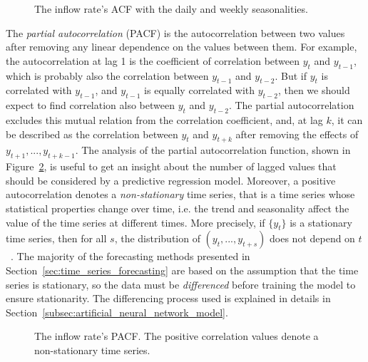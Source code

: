 \begin{figure}
  \begin{center}
  \end{center}
  \caption{The inflow rate's ACF with the daily and weekly seasonalities.}
  \label{fig:inflow_rate_acf}
\end{figure}

The \emph{partial autocorrelation} (PACF) is the autocorrelation between two values after removing any linear dependence on the values between them. For example, the autocorrelation at lag 1 is the coefficient of correlation between \( y_t \) and \( y_{t-1} \), which is probably also the correlation between \( y_{t-1} \) and \( y_{t-2} \). But if \( y_t \) is correlated with \( y_{t-1} \), and \( y_{t-1} \) is equally correlated with \( y_{t-2} \), then we should expect to find correlation also between \( y_t \) and \( y_{t-2} \). The partial autocorrelation excludes this mutual relation from the correlation coefficient, and, at lag \( k \), it can be described as the correlation between \( y_t \) and \( y_{t+k} \) after removing the effects of \( y_{t+1}, ..., y_{t+k-1} \). The analysis of the partial autocorrelation function, shown in Figure~\ref{fig:inflow_rate_pacf}, is useful to get an insight about the number of lagged values that should be considered by a predictive regression model. Moreover, a positive autocorrelation denotes a \emph{non-stationary} time series, that is a time series whose statistical properties change over time, i.e. the trend and seasonality affect the value of the time series at different times. More precisely, if \( \{ y_t \} \) is a stationary time series, then for all \( s \), the distribution of \( ( y_t, ..., y_{t+s}) \) does not depend on \( t \)~\cite{hyndman2018}. The majority of the forecasting methods presented in Section~\ref{sec:time_series_forecasting} are based on the assumption that the time series is stationary, so the data must be \emph{differenced} before training the model to ensure stationarity. The differencing process used is explained in details in Section~\ref{subsec:artificial_neural_network_model}.

\begin{figure}
  \begin{center}
  \end{center}
  \caption{The inflow rate's PACF. The positive correlation values denote a non-stationary time series.}
  \label{fig:inflow_rate_pacf}
\end{figure}

